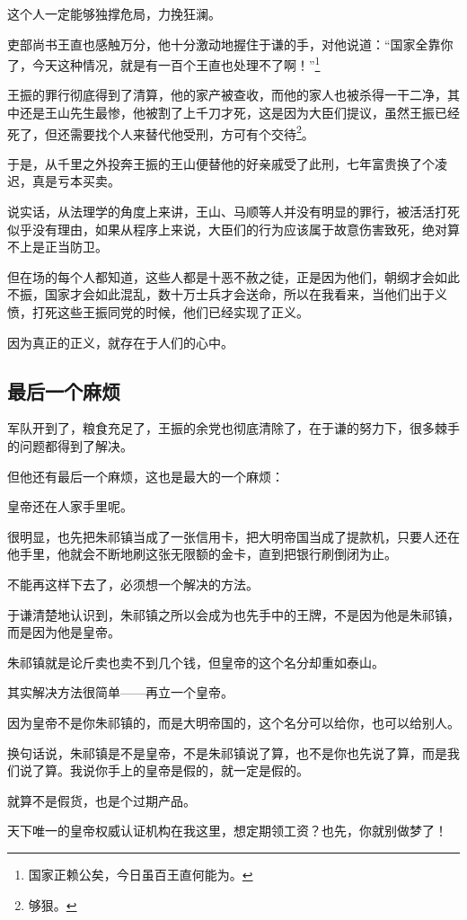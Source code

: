 \begin{multicols}{\theparacolNo}
这个人一定能够独撑危局，力挽狂澜。

吏部尚书王直也感触万分，他十分激动地握住于谦的手，对他说道：“国家全靠你了，今天这种情况，就是有一百个王直也处理不了啊！”\footnote{国家正赖公矣，今日虽百王直何能为。}

王振的罪行彻底得到了清算，他的家产被查收，而他的家人也被杀得一干二净，其中还是王山先生最惨，他被割了上千刀才死，这是因为大臣们提议，虽然王振已经死了，但还需要找个人来替代他受刑，方可有个交待\footnote{够狠。}。

于是，从千里之外投奔王振的王山便替他的好亲戚受了此刑，七年富贵换了个凌迟，真是亏本买卖。

说实话，从法理学的角度上来讲，王山、马顺等人并没有明显的罪行，被活活打死似乎没有理由，如果从程序上来说，大臣们的行为应该属于故意伤害致死，绝对算不上是正当防卫。

但在场的每个人都知道，这些人都是十恶不赦之徒，正是因为他们，朝纲才会如此不振，国家才会如此混乱，数十万士兵才会送命，所以在我看来，当他们出于义愤，打死这些王振同党的时候，他们已经实现了正义。

因为真正的正义，就存在于人们的心中。

\subsection{最后一个麻烦}
军队开到了，粮食充足了，王振的余党也彻底清除了，在于谦的努力下，很多棘手的问题都得到了解决。

但他还有最后一个麻烦，这也是最大的一个麻烦：

皇帝还在人家手里呢。

很明显，也先把朱祁镇当成了一张信用卡，把大明帝国当成了提款机，只要人还在他手里，他就会不断地刷这张无限额的金卡，直到把银行刷倒闭为止。

不能再这样下去了，必须想一个解决的方法。

于谦清楚地认识到，朱祁镇之所以会成为也先手中的王牌，不是因为他是朱祁镇，而是因为他是皇帝。

朱祁镇就是论斤卖也卖不到几个钱，但皇帝的这个名分却重如泰山。

其实解决方法很简单——再立一个皇帝。

因为皇帝不是你朱祁镇的，而是大明帝国的，这个名分可以给你，也可以给别人。

换句话说，朱祁镇是不是皇帝，不是朱祁镇说了算，也不是你也先说了算，而是我们说了算。我说你手上的皇帝是假的，就一定是假的。

就算不是假货，也是个过期产品。

天下唯一的皇帝权威认证机构在我这里，想定期领工资？也先，你就别做梦了！


\end{multicols}
